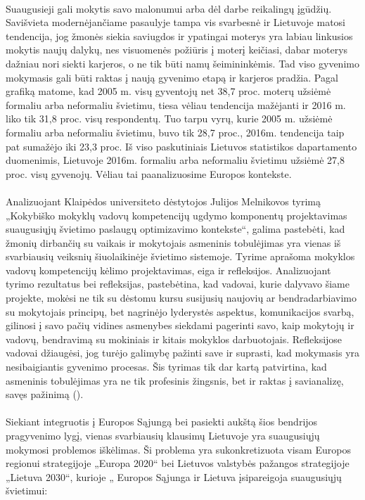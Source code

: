 \documentclass[12pt,a4paper, titlepage]{article}
\begin{document}
\paragraph{}
	 Suaugusieji gali mokytis savo malonumui arba dėl darbe reikalingų įgūdžių. Savišvieta modernėjančiame pasaulyje tampa vis svarbesnė ir Lietuvoje matosi tendencija, jog žmonės siekia saviugdos ir ypatingai moterys yra labiau linkusios mokytis naujų dalykų, nes visuomenės požiūris į moterį keičiasi, dabar moterys dažniau nori siekti karjeros, o ne tik būti namų šeimininkėmis.  Tad viso gyvenimo mokymasis gali būti raktas į naują gyvenimo etapą ir karjeros pradžia. Pagal grafiką matome, kad 2005 m. visų gyventojų net 38,7 proc. moterų užsiėmė formaliu arba neformaliu švietimu, tiesa vėliau tendencija mažėjanti ir 2016 m. liko tik 31,8 proc. visų respondentų. Tuo tarpu vyrų, kurie 2005 m. užsiėmė formaliu arba neformaliu švietimu, buvo tik 28,7 proc., 2016m. tendencija taip pat sumažėjo iki 23,3 proc. Iš viso paskutiniais Lietuvos statistikos dapartamento duomenimis, Lietuvoje 2016m. formaliu arba neformaliu švietimu užsiėmė 27,8 proc. visų gyvenojų. Vėliau tai paanalizuosime Europos kontekste.  
\paragraph{}
	  Analizuojant Klaipėdos universiteto dėstytojos Julijos Melnikovos tyrimą „Kokybiško mokyklų vadovų kompetencijų ugdymo komponentų projektavimas suaugusiųjų švietimo paslaugų optimizavimo kontekste“, galima pastebėti, kad žmonių dirbančių su vaikais ir mokytojais asmeninis tobulėjimas yra vienas iš svarbiausių veiksnių šiuolaikinėje švietimo sistemoje. Tyrime aprašoma mokyklos vadovų kompetencijų kėlimo projektavimas, eiga ir refleksijos. Analizuojant tyrimo rezultatus bei refleksijas, pastebėtina, kad vadovai, kurie dalyvavo šiame projekte, mokėsi ne tik su dėstomu kursu susijusių naujovių ar bendradarbiavimo su mokytojais principų, bet nagrinėjo lyderystės aspektus, komunikacijos svarbą, gilinosi į savo pačių vidines asmenybes siekdami pagerinti savo, kaip mokytojų ir vadovų, bendravimą su mokiniais ir kitais mokyklos darbuotojais.  Refleksijose vadovai džiaugėsi, jog turėjo galimybę pažinti save ir suprasti, kad mokymasis yra nesibaigiantis gyvenimo procesas. Šis tyrimas tik dar kartą patvirtina, kad asmeninis tobulėjimas yra ne tik profesinis žingsnis, bet ir raktas į savianalizę, savęs pažinimą (\cite{melnikova2012kokybivsko}).
\paragraph{}
 		Siekiant integruotis į Europos Sąjungą bei pasiekti aukštą šios bendrijos pragyvenimo lygį, vienas svarbiausių klausimų Lietuvoje yra suaugusiųjų mokymosi problemos iškėlimas.  Ši problema yra sukonkretizuota  visam Europos regionui strategijoje „Europa 2020“ bei Lietuvos valstybės pažangos strategijoje „Lietuva 2030“, kurioje „ Europos Sąjunga ir Lietuva įsipareigoja suaugusiųjų švietimui:
\end{document}
